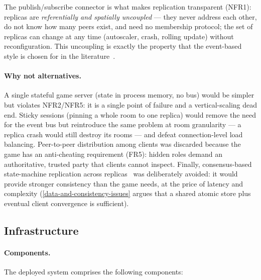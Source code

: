 \documentclass{scrartcl}
\begin{document}
The publish/subscribe connector is what makes replication transparent
(NFR1): replicas are \emph{referentially and spatially uncoupled} --- they
never address each other, do not know how many peers exist, and need no
membership protocol; the set of replicas can change at any time (autoscaler,
crash, rolling update) without reconfiguration. This uncoupling is exactly
the property that the event-based style is chosen for in the
literature~\cite{tanenbaum2017distributed}.

\paragraph{Why not alternatives.}
A single stateful game server (state in process memory, no bus) would be
simpler but violates NFR2/NFR5: it is a single point of failure and a
vertical-scaling dead end. Sticky sessions (pinning a whole room to one
replica) would remove the need for the event bus but reintroduce the same
problem at room granularity --- a replica crash would still destroy its rooms
--- and defeat connection-level load balancing. Peer-to-peer distribution
among clients was discarded because the game has an anti-cheating
requirement (FR5): hidden roles demand an authoritative, trusted party that
clients cannot inspect. Finally, consensus-based state-machine replication
across replicas~\cite{schneider1990implementing} was deliberately avoided:
it would provide stronger consistency than the game needs, at the price of
latency and complexity (\cref{data-and-consistency-issues} argues that a
shared atomic store plus eventual client convergence is sufficient).

\subsection{Infrastructure}\label{infrastructure}

\paragraph{Components.}
The deployed system comprises the following components:
\end{document}
